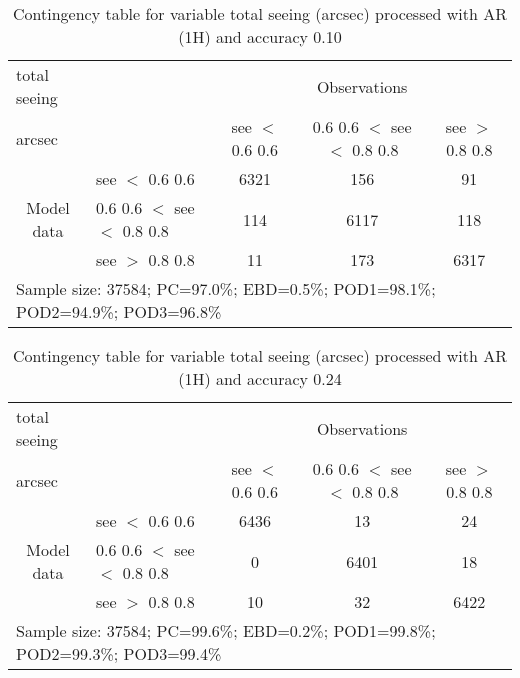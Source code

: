 \documentclass[11pt,english]{article}
\begin{document}
\begin{table}[]
\begin{center}
\begin{tabular}{llccc}
\hline
{total seeing}                                       &                                                    & \multicolumn{3}{c}{Observations}                 \\
{arcsec}                                       &                             & see $<$ 0.6
0.6   & 0.6
0.6 $<$ see $<$ 0.8
0.8 & see $>$ 0.8
0.8 \\
\hline
\multicolumn{1}{c}{\multirow{3}{*}{Model data}}  & see $<$ 0.6
0.6             & 6321                & 156                       & 91              \\
                                                 & 0.6
0.6  $<$ see $<$ 0.8
0.8 & 114                & 6117                       & 118              \\
                                                 & see $>$ 0.8
0.8             & 11                & 173                       & 6317              \\
\hline
\multicolumn{5}{l}{Sample size: 37584; PC=97.0\%; EBD=0.5\%; POD1=98.1\%; POD2=94.9\%; POD3=96.8\%}
\end{tabular}
\end{center}
\caption{Contingency table for variable total seeing (arcsec) processed with AR (1H) and accuracy 0.10}
\label{tab:contingencyseeAFT}
\end{table}
\begin{table}[]
\begin{center}
\begin{tabular}{llccc}
\hline
{total seeing}                                       &                                                    & \multicolumn{3}{c}{Observations}                 \\
{arcsec}                                       &                             & see $<$ 0.6
0.6   & 0.6
0.6 $<$ see $<$ 0.8
0.8 & see $>$ 0.8
0.8 \\
\hline
\multicolumn{1}{c}{\multirow{3}{*}{Model data}}  & see $<$ 0.6
0.6             & 6436                & 13                       & 24              \\
                                                 & 0.6
0.6  $<$ see $<$ 0.8
0.8 & 0                & 6401                       & 18              \\
                                                 & see $>$ 0.8
0.8             & 10                & 32                       & 6422              \\
\hline
\multicolumn{5}{l}{Sample size: 37584; PC=99.6\%; EBD=0.2\%; POD1=99.8\%; POD2=99.3\%; POD3=99.4\%}
\end{tabular}
\end{center}
\caption{Contingency table for variable total seeing (arcsec) processed with AR (1H) and accuracy 0.24}
\label{tab:contingencyseeAFT}
\end{table}
\end{document}
